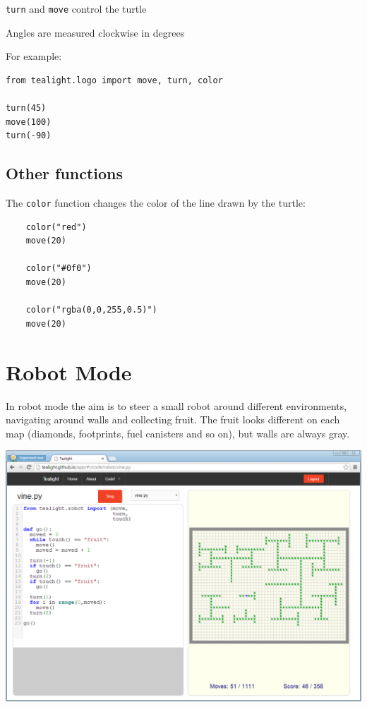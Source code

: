 \documentclass[12pt,a4paper,twoside]{article}
\renewcommand{\_}{\texttt{\symbol{95}}}
\begin{document}
\begin{bulletlist}
\item \verb^turn^ and \verb^move^ control the turtle
\item Angles are measured clockwise in degrees
\end{bulletlist}

For example:
\begin{verbatim}
from tealight.logo import move, turn, color

turn(45)
move(100)
turn(-90)
\end{verbatim}

\subsection{Other functions}

\begin{bulletlist}
\item The \verb^color^ function changes the color of the line drawn by the turtle:

	\begin{verbatim}
	color("red")
	move(20)

	color("#0f0")
	move(20)

	color("rgba(0,0,255,0.5)")
	move(20)
	\end{verbatim}
\end{bulletlist}



\newpage
\section{Robot Mode} \label{sec:robot-mode}

In robot mode the aim is to steer a small robot around different
environments, navigating around walls and collecting fruit. The
fruit looks different on each map (diamonds, footprints, fuel canisters and so on), but
walls are always gray.

\begin{center}
\includegraphics[scale=0.5,angle=0]{screenshots/ide/robot}
\end{center}
\end{document}
